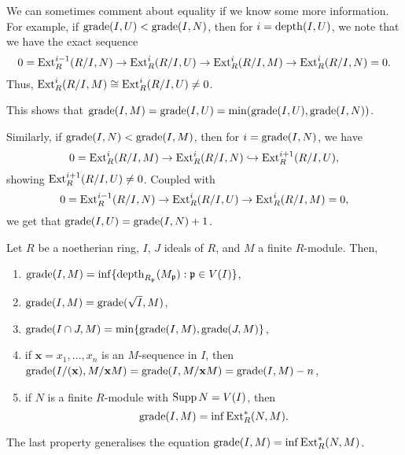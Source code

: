 \documentclass[12pt]{article}
\begin{document}
\begin{rem} \label{rem:grade-equalities-exact-sequences}
	We can sometimes comment about equality if we know some more information. For example, if $\operatorname{grade}(I, U) < \operatorname{grade}(I, N)$, then for $i = \operatorname{depth}(I, U)$, we note that we have the exact sequence
	\begin{equation*} 
		0 = \operatorname{Ext}_{R}^{i - 1}(R/I, N) \to \operatorname{Ext}_{R}^{i}(R/I, U) \to \operatorname{Ext}_{R}^{i}(R/I, M) \to \operatorname{Ext}_{R}^{i}(R/I, N) = 0.
	\end{equation*}
	Thus, $\operatorname{Ext}_{R}^{i}(R/I, M) \cong \operatorname{Ext}_{R}^{i}(R/I, U) \neq 0$. 

	This shows that $\operatorname{grade}(I, M) = \operatorname{grade}(I, U) = \min(\operatorname{grade}(I, U), \operatorname{grade}(I, N))$.

	Similarly, if $\operatorname{grade}(I, N) < \operatorname{grade}(I, M)$, then for $i = \operatorname{grade}(I, N)$, we have
	\begin{equation*} 
		0 = \operatorname{Ext}_{R}^{i}(R/I, M) \to \operatorname{Ext}_{R}^{i}(R/I, N) \hookrightarrow \operatorname{Ext}_{R}^{i + 1}(R/I, U),
	\end{equation*}
	showing $\operatorname{Ext}_{R}^{i + 1}(R/I, U) \neq 0$. Coupled with
	\begin{equation*} 
		0 = \operatorname{Ext}_{R}^{i - 1}(R/I, N) \to \operatorname{Ext}_{R}^{i}(R/I, U) \to \operatorname{Ext}_{R}^{i}(R/I, M) = 0,
	\end{equation*}
	we get that $\operatorname{grade}(I, U) = \operatorname{grade}(I, N) + 1$.
\end{rem}

\begin{prop} \label{prop:grade-properties}
	Let $R$ be a noetherian ring, $I$, $J$ ideals of $R$, and $M$ a finite $R$-module. Then,
	\begin{enumerate}[label=(\alph*)]
		\item $\operatorname{grade}(I, M) = \inf\{\operatorname{depth}_{R_{\mathfrak{p}}}(M_{\mathfrak{p}}) : \mathfrak{p} \in V(I)\}$,
		\item $\operatorname{grade}(I, M) = \operatorname{grade}(\sqrt{I}, M)$,
		\item $\operatorname{grade}(I \cap J, M) = \min\{\operatorname{grade}(I, M), \operatorname{grade}(J, M)\}$,
		\item if $\mathbf{x} = x_{1}, \ldots, x_{n}$ is an $M$-sequence in $I$, then $\operatorname{grade}(I/(\mathbf{x}), M/\mathbf{x}M) = \operatorname{grade}(I, M/\mathbf{x} M) = \operatorname{grade}(I, M) - n$,
		\item if $N$ is a finite $R$-module with $\operatorname{Supp} N = V(I)$, then
		\begin{equation*} 
			\operatorname{grade}(I, M) = \inf \operatorname{Ext}_{R}^{\ast}(N, M).
		\end{equation*}
	\end{enumerate}
\end{prop}
The last property generalises the equation $\operatorname{grade}(I, M) = \inf \operatorname{Ext}_{R}^{\ast}(N, M)$.
\end{document}
